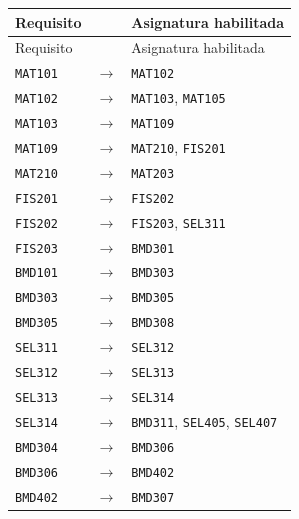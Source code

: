 \documentclass[10pt,letterpaper]{article}
\newcommand{\coursecode}[1]{\texttt{#1}}
\begin{document}
\small
\begin{longtable}{>{\raggedleft\arraybackslash}p{4.1cm}>{\centering\arraybackslash}p{1cm}p{8.2cm}}
\toprule
Requisito & & Asignatura habilitada \\
\midrule
\endfirsthead
\toprule
Requisito & & Asignatura habilitada \\
\midrule
\endhead
\coursecode{MAT101} & $\longrightarrow$ & \coursecode{MAT102} \\
\coursecode{MAT102} & $\longrightarrow$ & \coursecode{MAT103}, \coursecode{MAT105} \\
\coursecode{MAT103} & $\longrightarrow$ & \coursecode{MAT109} \\
\coursecode{MAT109} & $\longrightarrow$ & \coursecode{MAT210}, \coursecode{FIS201} \\
\coursecode{MAT210} & $\longrightarrow$ & \coursecode{MAT203} \\
\coursecode{FIS201} & $\longrightarrow$ & \coursecode{FIS202} \\
\coursecode{FIS202} & $\longrightarrow$ & \coursecode{FIS203}, \coursecode{SEL311} \\
\coursecode{FIS203} & $\longrightarrow$ & \textcolor{bmdgreen}{\coursecode{BMD301}} \\
\textcolor{bmdgreen}{\coursecode{BMD101}} & $\longrightarrow$ & \textcolor{bmdgreen}{\coursecode{BMD303}} \\
\textcolor{bmdgreen}{\coursecode{BMD303}} & $\longrightarrow$ & \textcolor{bmdgreen}{\coursecode{BMD305}} \\
\textcolor{bmdgreen}{\coursecode{BMD305}} & $\longrightarrow$ & \textcolor{bmdgreen}{\coursecode{BMD308}} \\
\coursecode{SEL311} & $\longrightarrow$ & \coursecode{SEL312} \\
\coursecode{SEL312} & $\longrightarrow$ & \coursecode{SEL313} \\
\coursecode{SEL313} & $\longrightarrow$ & \coursecode{SEL314} \\
\coursecode{SEL314} & $\longrightarrow$ & \textcolor{bmdgreen}{\coursecode{BMD311}}, \coursecode{SEL405}, \coursecode{SEL407} \\
\textcolor{bmdgreen}{\coursecode{BMD304}} & $\longrightarrow$ & \textcolor{bmdgreen}{\coursecode{BMD306}} \\
\textcolor{bmdgreen}{\coursecode{BMD306}} & $\longrightarrow$ & \textcolor{bmdgreen}{\coursecode{BMD402}} \\
\textcolor{bmdgreen}{\coursecode{BMD402}} & $\longrightarrow$ & \textcolor{bmdgreen}{\coursecode{BMD307}} \\

\end{longtable}
\end{document}
